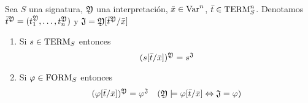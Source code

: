 \begin{theorem} 
Sea $S$ una signatura, $\mathfrak{Y}$ una interpretación, $\bar{x} \in \mbox{Var}^n$, $\bar{t}\in \mbox{TERM}_{S}^n$. Denotamos $\bar{t}^{\mathfrak{Y}}=(t_1^{\mathfrak{Y}}, \ldots, t_n^{\mathfrak{Y}})$ y $\mathfrak{J}=\mathfrak{Y}[\bar{t}^{\mathfrak{Y}}/\bar{x}]$
\begin{enumerate}
	\item Si $s \in \mbox{TERM}_{S}$ entonces
	\[ (s[\bar{t}/\bar{x}])^{\mathfrak{Y}}=s^{\mathfrak{J}} \]
	\item Si $\varphi \in \mbox{FORM}_{S}$ entonces
	\[ (\varphi[\bar{t}/\bar{x}])^{\mathfrak{Y}}=\varphi^{\mathfrak{J}} \quad (\mathfrak{Y}\models \varphi[\bar{t}/\bar{x}] \Leftrightarrow \mathfrak{J}=\varphi) \]
\end{enumerate}
\end{theorem}